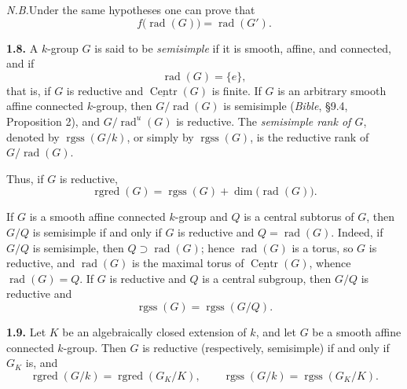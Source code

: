\noindent\textit{N.B.}\quad Under the same hypotheses one can prove that
\[
  f\bigl(\operatorname{rad}(G)\bigr)=\operatorname{rad}(G').
\]


\par\medskip\noindent{}\textbf{1.8.}\quad
A \(k\)-group \(G\) is said to be \emph{semisimple} if it is smooth,
affine, and connected, and if
\[
  \operatorname{rad}(G)=\{e\},
\]
that is, if \(G\) is reductive and
\(\underline{\operatorname{Centr}}(G)\) is finite.  If \(G\) is an
arbitrary smooth affine connected \(k\)-group, then
\(G/\operatorname{rad}(G)\) is semisimple (\emph{Bible}, §9.4,
Proposition 2), and \(G/\operatorname{rad}^{u}(G)\) is reductive.  The
\emph{semisimple rank of \(G\)}, denoted by
\(\operatorname{rgss}(G/k)\), or simply by \(\operatorname{rgss}(G)\), is
the reductive rank of \(G/\operatorname{rad}(G)\).

Thus, if \(G\) is reductive,
\[
  \operatorname{rgred}(G)
  =
  \operatorname{rgss}(G)+\dim\bigl(\operatorname{rad}(G)\bigr).
\]

If \(G\) is a smooth affine connected \(k\)-group and \(Q\) is a central
subtorus of \(G\), then \(G/Q\) is semisimple if and only if \(G\) is
reductive and \(Q=\operatorname{rad}(G)\).  Indeed, if \(G/Q\) is
semisimple, then \(Q\supset\operatorname{rad}(G)\); hence
\(\operatorname{rad}(G)\) is a torus, so \(G\) is reductive, and
\(\operatorname{rad}(G)\) is the maximal torus of
\(\underline{\operatorname{Centr}}(G)\), whence
\(\operatorname{rad}(G)=Q\).  If \(G\) is reductive and \(Q\) is a central
subgroup, then \(G/Q\) is reductive and
\[
  \operatorname{rgss}(G)=\operatorname{rgss}(G/Q).
\]

\par\medskip\noindent{}\textbf{1.9.}\quad
Let \(K\) be an algebraically closed extension of \(k\), and let \(G\) be
a smooth affine connected \(k\)-group.  Then \(G\) is reductive
(respectively, semisimple) if and only if \(G_K\) is, and
\[
  \operatorname{rgred}(G/k)=\operatorname{rgred}(G_K/K),
  \qquad
  \operatorname{rgss}(G/k)=\operatorname{rgss}(G_K/K).
\]

